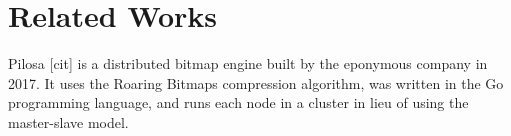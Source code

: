 \section{Related Works}
Pilosa [cit] is a distributed bitmap engine built by the eponymous company in
2017. It uses the Roaring Bitmaps compression algorithm, was written in the
Go programming language, and runs each node in a cluster in lieu of using
the master-slave model. 
